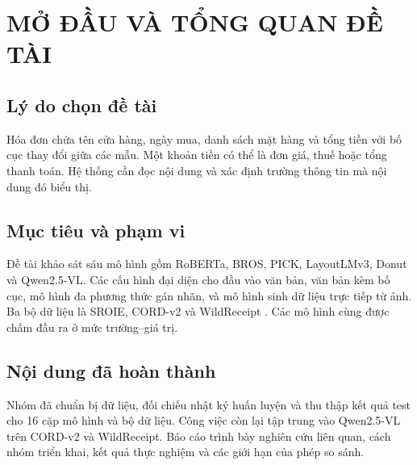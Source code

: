 \chapter{MỞ ĐẦU VÀ TỔNG QUAN ĐỀ TÀI}
\section{Lý do chọn đề tài}
Hóa đơn chứa tên cửa hàng, ngày mua, danh sách mặt hàng và tổng tiền với bố cục thay đổi giữa các mẫu. Một khoản tiền có thể là đơn giá, thuế hoặc tổng thanh toán. Hệ thống cần đọc nội dung và xác định trường thông tin mà nội dung đó biểu thị.

\section{Mục tiêu và phạm vi}
Đề tài khảo sát sáu mô hình gồm RoBERTa, BROS, PICK, LayoutLMv3, Donut và Qwen2.5-VL. Các cấu hình đại diện cho đầu vào văn bản, văn bản kèm bố cục, mô hình đa phương thức gán nhãn, và mô hình sinh dữ liệu trực tiếp từ ảnh. Ba bộ dữ liệu là SROIE, CORD-v2 và WildReceipt \parencite{huang2019,park2019,sun2021}. Các mô hình cùng được chấm đầu ra ở mức trường--giá trị.

\section{Nội dung đã hoàn thành}
Nhóm đã chuẩn bị dữ liệu, đối chiếu nhật ký huấn luyện và thu thập kết quả test cho 16 cặp mô hình và bộ dữ liệu. Công việc còn lại tập trung vào Qwen2.5-VL trên CORD-v2 và WildReceipt. Báo cáo trình bày nghiên cứu liên quan, cách nhóm triển khai, kết quả thực nghiệm và các giới hạn của phép so sánh.

